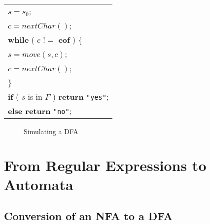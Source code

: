 \documentclass[a4paper,twoside]{book}
\begin{document}
\begin{center}
    \begin{tabular}{l}
        $s=s_0$;\\
        $c=nextChar()$;\\
        \textbf{while} ( $c$ !$=$ \textbf{eof} ) \{\\
        \qquad $s=move(s,c)$;\\
        \qquad $c=nextChar()$;\\
        \}\\
        \textbf{if} ( $s$ is in $F$ ) \textbf{return} \verb|"yes"|;\\
        \textbf{else return} \verb|"no"|;
    \end{tabular}
\end{center}
\begin{figure}[htbp]
    \caption{Simulating a DFA}
    \label{Figure:3.27}
\end{figure}

\section{From Regular Expressions to Automata}
\subsection{Conversion of an NFA to a DFA}
\end{document}
